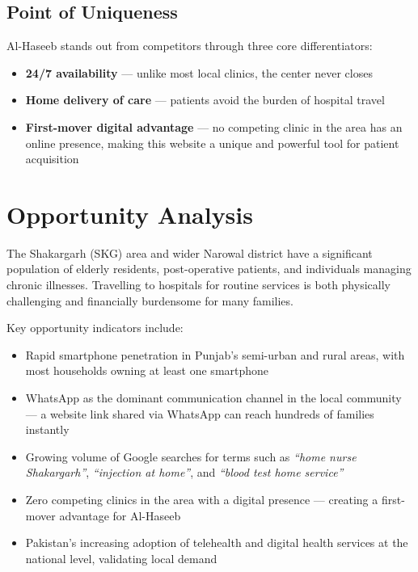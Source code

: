 \documentclass[12pt, a4paper]{article}
\begin{document}
\subsection{Point of Uniqueness}

Al-Haseeb stands out from competitors through three core differentiators:

\begin{itemize}[leftmargin=1.4em]
    \item \textbf{24/7 availability} — unlike most local clinics, the center never closes
    \item \textbf{Home delivery of care} — patients avoid the burden of hospital travel
    \item \textbf{First-mover digital advantage} — no competing clinic in the area has an online presence, making this website a unique and powerful tool for patient acquisition
\end{itemize}

\newpage

\section{Opportunity Analysis}

The Shakargarh (SKG) area and wider Narowal district have a significant population of elderly residents, post-operative patients, and individuals managing chronic illnesses. Travelling to hospitals for routine services is both physically challenging and financially burdensome for many families.

Key opportunity indicators include:

\begin{itemize}[leftmargin=1.4em]
    \item Rapid smartphone penetration in Punjab's semi-urban and rural areas, with most households owning at least one smartphone
    \item WhatsApp as the dominant communication channel in the local community — a website link shared via WhatsApp can reach hundreds of families instantly
    \item Growing volume of Google searches for terms such as \textit{``home nurse Shakargarh''}, \textit{``injection at home''}, and \textit{``blood test home service''}
    \item Zero competing clinics in the area with a digital presence — creating a first-mover advantage for Al-Haseeb
    \item Pakistan's increasing adoption of telehealth and digital health services at the national level, validating local demand
\end{itemize}
\end{document}
